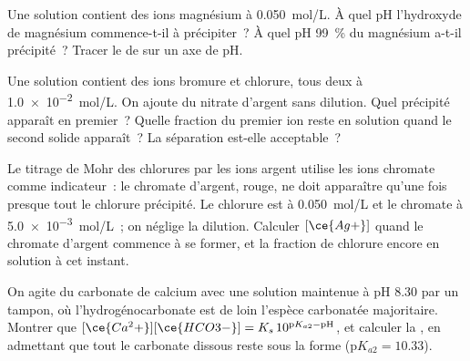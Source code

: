 \begin{exercise}[$\star\star$]\label{exo:b1:precipitation:6}
Une solution contient des ions magnésium à \qty{0.050}{mol/L}. À quel pH
l'hydroxyde de magnésium commence-t-il à précipiter~? À quel pH
\qty{99}{\percent} du magnésium a-t-il précipité~? Tracer le  de  sur un axe de pH.
\end{exercise}

\begin{exercise}[$\star\star$]\label{exo:b1:precipitation:7}
Une solution contient des ions bromure et chlorure, tous deux à
\qty{1.0e-2}{mol/L}. On ajoute du nitrate d'argent sans dilution. Quel
précipité apparaît en premier~? Quelle fraction du premier ion reste en
solution quand le second solide apparaît~? La séparation est-elle
acceptable~?
\end{exercise}

\begin{exercise}[$\star\star$]\label{exo:b1:precipitation:8}
Le titrage de Mohr des chlorures par les ions argent utilise les ions
chromate comme indicateur~: le chromate d'argent, rouge, ne doit
apparaître qu'une fois presque tout le chlorure précipité. Le chlorure
est à \qty{0.050}{mol/L} et le chromate à \qty{5.0e-3}{mol/L}~; on
néglige la dilution. Calculer $[\ce{Ag+}]$ quand le chromate d'argent
commence à se former, et la fraction de chlorure encore en solution à
cet instant.
\end{exercise}

\begin{exercise}[$\star\star$]\label{exo:b1:precipitation:9}
On agite du carbonate de calcium avec une solution maintenue à pH 8.30
par un tampon, où l'hydrogénocarbonate est de loin l'espèce carbonatée
majoritaire. Montrer que
$[\ce{Ca^2+}][\ce{HCO3-}] = K_s\,10^{\mathrm{p}K_{a2} - \mathrm{pH}}$, et
calculer la , en admettant que tout le carbonate dissous
reste sous la forme  ($\mathrm{p}K_{a2} = 10.33$).
\end{exercise}

